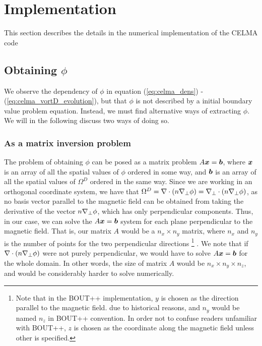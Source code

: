 \section{Implementation}
\label{sec:implementation}
This section describes the details in the numerical implementation of the CELMA
code

\subsection{Obtaining \texorpdfstring{$\phi$}{the potential}}
%
We observe the dependency of $\phi$ in equation (\ref{eq:celma_dens}) -
(\ref{eq:celma_vortD_evolution}), but that $\phi$ is not described by a
initial boundary value problem equation. Instead, we must find alternative ways
of extracting $\phi$. We will in the following discuss two ways of doing so.

\subsubsection{As a matrix inversion problem}
%
The problem of obtaining $\phi$ can be posed as a matrix problem
$A\boldsymbol{x}=\boldsymbol{b}$, where $\boldsymbol{x}$ is an array of all the spatial values of
$\phi$ ordered in some way, and $\boldsymbol{b}$ is an array of all the spatial values
of $\Omega^D$ ordered in the same way. Since we are working in an orthogonal
coordinate system, we have that $\Omega^D = \nabla\cdot\left(n\nabla_\perp\phi\right) =
\nabla_\perp\cdot\left(n\nabla_\perp\phi\right)$, as no basis vector parallel to the
magnetic field can be obtained from taking the derivative of the vector
$n\nabla_\perp\phi$, which has only perpendicular components. Thus, in our case,
we can solve the $A\boldsymbol{x}=\boldsymbol{b}$ system for each plane perpendicular to the
magnetic field. That is, our matrix $A$ would be a $n_x \times n_y$ matrix,
where $n_x$ and $n_y$ is the number of points for the two perpendicular
directions
%
\footnote{
Note that in the BOUT++ implementation, $y$ is chosen as the direction parallel
to the magnetic field.  due to historical reasons, and $n_y$ would be named
$n_z$ in BOUT++ convention.  In order not to confuse readers unfamiliar with
BOUT++, $z$ is chosen as the coordinate along the magnetic field unless other
is specified.
}%
%
. We note that if $\nabla\cdot\left(n\nabla_\perp\phi\right)$ were not purely
perpendicular, we would have to solve $A\boldsymbol{x}=\boldsymbol{b}$ for the whole domain. In
other words, the size of matrix $A$ would be $n_x \times n_y \times n_z$, and
would be considerably harder to solve numerically.

